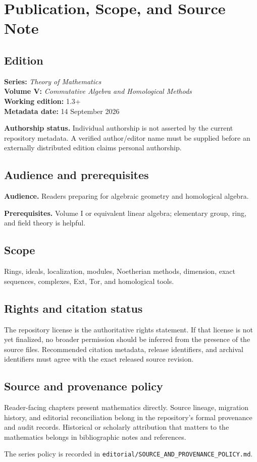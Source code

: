 \chapter*{Publication, Scope, and Source Note}
{}

\section*{Edition}
\textbf{Series:} \emph{Theory of Mathematics}\\
\textbf{Volume V:} \emph{Commutative Algebra and Homological Methods}\\
\textbf{Working edition:} 1.3+\\
\textbf{Metadata date:} 14 September 2026

\textbf{Authorship status.} Individual authorship is not asserted by the current repository metadata. A verified author/editor name must be supplied before an externally distributed edition claims personal authorship.

\section*{Audience and prerequisites}
\textbf{Audience.} Readers preparing for algebraic geometry and homological algebra.

\textbf{Prerequisites.} Volume I or equivalent linear algebra; elementary group, ring, and field theory is helpful.

\section*{Scope}
Rings, ideals, localization, modules, Noetherian methods, dimension, exact sequences, complexes, Ext, Tor, and homological tools.

\section*{Rights and citation status}
The repository license is the authoritative rights statement. If that license is
not yet finalized, no broader permission should be inferred from the presence of
the source files. Recommended citation metadata, release identifiers, and
archival identifiers must agree with the exact released source revision.

\section*{Source and provenance policy}
Reader-facing chapters present mathematics directly. Source lineage, migration
history, and editorial reconciliation belong in the repository's formal
provenance and audit records. Historical or scholarly attribution that matters
to the mathematics belongs in bibliographic notes and references.

The series policy is recorded in
\texttt{editorial/SOURCE\_AND\_PROVENANCE\_POLICY.md}.
